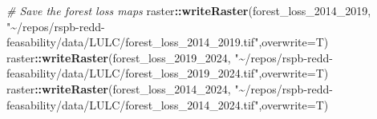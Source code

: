 \documentclass[
]{article}
\newenvironment{Shaded}{\begin{snugshade}}{\end{snugshade}}
\newcommand{\AttributeTok}[1]{\textcolor[rgb]{0.13,0.29,0.53}{#1}}
\newcommand{\CommentTok}[1]{\textcolor[rgb]{0.56,0.35,0.01}{\textit{#1}}}
\newcommand{\FunctionTok}[1]{\textcolor[rgb]{0.13,0.29,0.53}{\textbf{#1}}}
\newcommand{\NormalTok}[1]{#1}
\newcommand{\SpecialCharTok}[1]{\textcolor[rgb]{0.81,0.36,0.00}{\textbf{#1}}}
\newcommand{\StringTok}[1]{\textcolor[rgb]{0.31,0.60,0.02}{#1}}
\begin{document}
\begin{Shaded}
\begin{Highlighting}[]
\CommentTok{\# Save the forest loss maps}
\NormalTok{raster}\SpecialCharTok{::}\FunctionTok{writeRaster}\NormalTok{(forest\_loss\_2014\_2019, }\StringTok{"\textasciitilde{}/repos/rspb{-}redd{-}feasability/data/LULC/forest\_loss\_2014\_2019.tif"}\NormalTok{,}\AttributeTok{overwrite=}\NormalTok{T)}
\NormalTok{raster}\SpecialCharTok{::}\FunctionTok{writeRaster}\NormalTok{(forest\_loss\_2019\_2024, }\StringTok{"\textasciitilde{}/repos/rspb{-}redd{-}feasability/data/LULC/forest\_loss\_2019\_2024.tif"}\NormalTok{,}\AttributeTok{overwrite=}\NormalTok{T)}
\NormalTok{raster}\SpecialCharTok{::}\FunctionTok{writeRaster}\NormalTok{(forest\_loss\_2014\_2024, }\StringTok{"\textasciitilde{}/repos/rspb{-}redd{-}feasability/data/LULC/forest\_loss\_2014\_2024.tif"}\NormalTok{,}\AttributeTok{overwrite=}\NormalTok{T)}
\end{Highlighting}
\end{Shaded}
\end{document}
